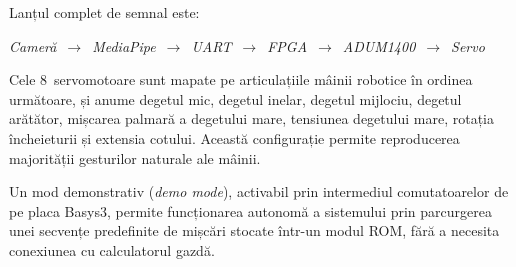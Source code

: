 Lanțul complet de semnal este:
\begin{center}
\mbox{\textit{Cameră} $\rightarrow$ \textit{MediaPipe} $\rightarrow$ \textit{UART} $\rightarrow$ \textit{FPGA} $\rightarrow$ \textit{ADUM1400} $\rightarrow$ \textit{Servo}}
\end{center}

Cele 8~servomotoare sunt mapate pe articulațiile mâinii robotice în ordinea
următoare, și anume degetul mic, degetul inelar, degetul mijlociu, degetul arătător,
mișcarea palmară a degetului mare, tensiunea degetului mare, rotația
încheieturii și extensia cotului. Această configurație permite reproducerea
majorității gesturilor naturale ale mâinii.

Un mod demonstrativ (\textit{demo mode}), activabil prin intermediul
comutatoarelor de pe placa Basys3, permite funcționarea autonomă a
sistemului prin parcurgerea unei secvențe predefinite de mișcări stocate
într-un modul ROM, fără a necesita conexiunea cu calculatorul gazdă.
